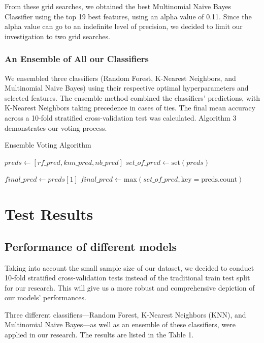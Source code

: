 \documentclass[journal,comsoc]{IEEEtran}
\begin{document}
From these grid searches, we obtained the best Multinomial Naive Bayes Classifier using the top 19 best features, using an alpha value of 0.11. Since the alpha value can go to an indefinite level of precision, we decided to limit our investigation to two grid searches.

\subsubsection{An Ensemble of All our Classifiers}
We ensembled three classifiers (Random Forest, K-Nearest Neighbors, and Multinomial Naive Bayes) using their respective optimal hyperparameters and selected features. The ensemble method combined the classifiers' predictions, with K-Nearest Neighbors taking precedence in cases of ties. The final mean accuracy across a 10-fold stratified cross-validation test was calculated. Algorithm 3 demonstrates our voting process.


\begin{algorithm}
\caption{Ensemble Voting Algorithm}
\begin{algorithmic}
\State
\State $preds \gets [rf\_pred, knn\_pred, nb\_pred]$
\State $set\_of\_pred \gets \text{set}(preds)$

    \State $final\_pred \gets preds[1]$
\Else
    \State $final\_pred \gets \text{max}(set\_of\_pred, \text{key} = \text{preds.count})$
\EndIf
\State
\end{algorithmic}
\end{algorithm}

\section{Test Results}
\subsection{Performance of different models}
Taking into account the small sample size of our dataset, we decided to conduct 10-fold stratified cross-validation tests instead of the traditional train test split for our research. This will give us a more robust and comprehensive depiction of our models' performances.

Three different classifiers—Random Forest, K-Nearest Neighbors (KNN), and Multinomial Naive Bayes—as well as an ensemble of these classifiers, were applied in our research. The results are listed in the Table 1.
\end{document}
